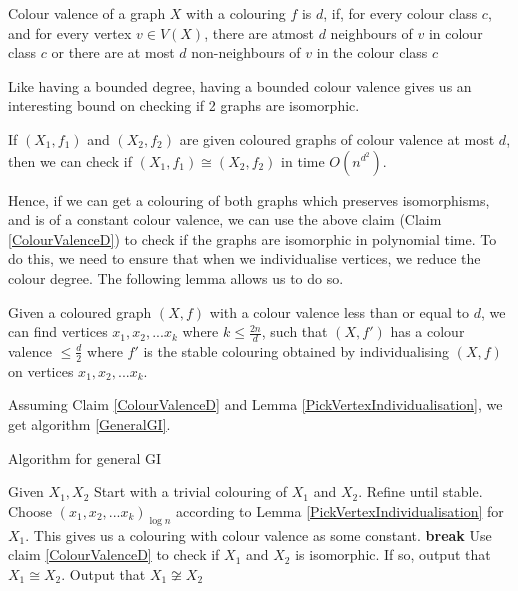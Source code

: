 \begin{definition}
Colour valence of a graph $X$ with a colouring $f$ is $d$, if, for every colour class $c$, and for every vertex $v \in V(X)$, there are atmost $d$ neighbours of $v$ in colour class $c$ or there are at most $d$ non-neighbours of $v$ in the colour class $c$
\end{definition}

Like having a bounded degree, having a bounded colour valence gives us an interesting bound on checking if 2 graphs are isomorphic.
\begin{claim}\label{ColourValenceD}
If $(X_1, f_1)$ and $(X_2, f_2)$ are given coloured graphs of colour valence at most $d$, then we can check if $(X_1, f_1) \cong (X_2, f_2)$ in time $O(n^{d^2})$.
\end{claim}

Hence, if we can get a colouring of both graphs which preserves isomorphisms, and is of a constant colour valence, we can use the above claim (Claim \ref{ColourValenceD}) to check if the graphs are isomorphic in polynomial time. 
To do this, we need to ensure that when we individualise vertices, we reduce the colour degree. The following lemma allows us to do so.

\begin{lemma} \label{PickVertexIndividualisation}
Given a coloured graph $(X, f)$ with a colour valence less than or equal to $d$, we can find vertices $x_1, x_2, ... x_k$ where $k \le \frac{2n}{d}$, such that $(X, f')$ has a colour valence $\le \frac{d}{2}$ where $f'$ is the stable colouring obtained by individualising $(X,f)$ on vertices $x_1, x_2, ... x_k$.
\end{lemma}  

Assuming Claim \ref{ColourValenceD} and Lemma \ref{PickVertexIndividualisation}, we get algorithm \ref{GeneralGI}.

\begin{algorithm}[htp!]
\caption{Algorithm for general GI}\label{GeneralGI}
\label{alg:generalGI}
\begin{algorithmic}[1]
\State Given $X_1, X_2$
\State Start with a trivial colouring of $X_1$ and $X_2$. Refine until stable.
\State Choose $(x_1, x_2, ...x_k)_{\log n}$ according to Lemma \ref{PickVertexIndividualisation} for $X_1$. This gives us a colouring with colour valence as some constant.
		\State \textbf{break}
	\Else
		\State Use claim \ref{ColourValenceD} to check if $X_1$ and $X_2$ is isomorphic.
		\State If so, output that $X_1 \cong X_2$.
	\EndIf
\EndFor
\State Output that $X_1 \not \cong X_2$
\EndProcedure
\end{algorithmic}
\end{algorithm}

